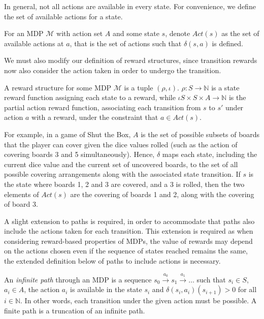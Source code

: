 In general, not all actions are available in every state. For convenience, we define the set of available actions for a state.

\begin{definition}
\label{cs1:available_actions}

For an MDP $\mathcal{M}$ with action set $A$ and some state $s$, denote $Act(s)$ as the set of available actions at $a$, that is the set of actions such that $\delta(s, a)$ is defined.

\end{definition}

We must also modify our definition of reward structures, since transition rewards now also consider the action taken in order to undergo the transition.

\begin{definition}
\label{cs1:mdp_rewards}

A reward structure for some MDP $\mathcal{M}$ is a tuple $(\rho, \iota)$. $\rho : S \rightarrow \mathbb{N}$ is a state reward function assigning each state to a reward, while $\iota S \times S \times A \rightarrow \mathbb{N}$ is the partial action reward function, associating each transition from $s$ to $s'$ under action $a$ with a reward, under the constraint that $a \in Act(s)$.
\end{definition}

For example, in a game of Shut the Box, $A$ is the set of possible subsets of boards that the player can cover given the dice values rolled (such as the action of covering boards 3 and 5 simultaneously). Hence, $\delta$ maps each state, including the current dice value and the current set of uncovered boards, to the set of all possible covering arrangements along with the associated state transition. If $s$ is the state where boards 1, 2 and 3 are covered, and a 3 is rolled, then the two elements of $Act(s)$ are the covering of boards 1 and 2, along with the covering of board 3.

A slight extension to paths is required, in order to accommodate that paths also include the actions taken for each transition.  This extension is required as when considering reward-based properties of MDPs, the value of rewards may depend on the actions chosen even if the sequence of states reached remains the same, the extended definition below of paths to include actions is necessary.

\begin{definition}
\label{cs1:mdp_paths}

An \emph{infinite path} through an MDP is a sequence $s_0 \xrightarrow{a_0} s_1 \xrightarrow{a_1} \dots$ such that $s_i \in S$, $a_i \in A$, the action $a_i$ is available in the state $s_i$ and $\delta(s_i,a_i)(s_{i+1}) > 0$ for all $i \in \mathbb{N}$. In other words, each transition under the given action must be possible. A finite path is a truncation of an infinite path.

\end{definition}


